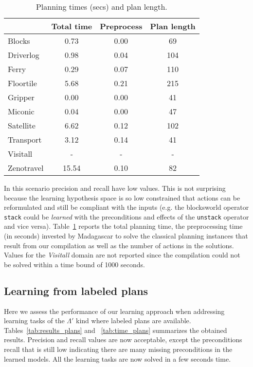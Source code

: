 \documentclass[letterpaper]{article} %
\begin{document}
\begin{table}
\begin{footnotesize}
	\begin{center}
		\begin{tabular}{l|c|c|c|}			
			 & Total time & Preprocess & Plan length  \\
			\hline
                        Blocks & 0.73 & 0.00 & 69  \\
			Driverlog & 0.98 & 0.04 & 104 \\
			Ferry & 0.29 & 0.07 & 110 \\
			Floortile & 5.68 & 0.21 & 215 \\
			Gripper & 0.00 & 0.00 & 41 \\
			Miconic & 0.04 & 0.00 & 47 \\
			Satellite & 6.62 & 0.12 & 102 \\
			Transport & 3.12 & 0.14 & 41 \\			
			Visitall & - & - & - \\
			Zenotravel & 15.54 & 0.10 & 82 \\
		\end{tabular}
	\end{center}
        \end{footnotesize}
	\caption{\small Planning times (secs) and plan length.}
	\label{tab:time_states}	
\end{table}


In this scenario precision and recall have low values. This is not surprising because the learning hypothesis space is so low constrained that actions can be reformulated and still be compliant with the inputs (e.g. the blocksworld operator {\small\tt stack} could be {\em learned} with the preconditions and effects of the {\small\tt unstack} operator and vice versa). Table~\ref{tab:time_states} reports the total planning time, the preprocessing time (in seconds) invested by {\sc Madagascar} to solve the classical planning instances that result from our compilation as well as the number of actions in the solutions. Values for the {\em Visitall} domain are not reported since the compilation could not be solved within a time bound of 1000 seconds.


\subsection{Learning from labeled plans}
Here we assess the performance of our learning approach when addressing learning tasks of the $\Lambda'$ kind where labeled plans are available. Tables~\ref{tab:results_plans} and ~\ref{tab:time_plans} summarizes the obtained results. Precision and recall values are now acceptable, except the preconditions recall that is still low indicating there are many missing preconditions in the learned models. All the learning tasks are now solved in a few seconds time.	
\end{document}
